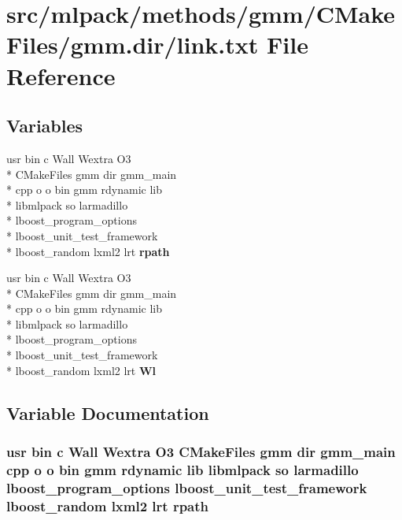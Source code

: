 \section{src/mlpack/methods/gmm/\-C\-Make\-Files/gmm.dir/link.txt File Reference}
\label{methods_2gmm_2CMakeFiles_2gmm_8dir_2link_8txt}
\subsection*{Variables}
\begin{DoxyCompactItemize}
\item 
usr bin c Wall Wextra O3 \\*
C\-Make\-Files gmm dir gmm\-\_\-main \\*
cpp o o bin gmm rdynamic lib \\*
libmlpack so larmadillo \\*
lboost\-\_\-program\-\_\-options \\*
lboost\-\_\-unit\-\_\-test\-\_\-framework \\*
lboost\-\_\-random lxml2 lrt {\bf rpath}
\item 
usr bin c Wall Wextra O3 \\*
C\-Make\-Files gmm dir gmm\-\_\-main \\*
cpp o o bin gmm rdynamic lib \\*
libmlpack so larmadillo \\*
lboost\-\_\-program\-\_\-options \\*
lboost\-\_\-unit\-\_\-test\-\_\-framework \\*
lboost\-\_\-random lxml2 lrt {\bf Wl}
\end{DoxyCompactItemize}


\subsection{Variable Documentation}
\subsubsection[{rpath}]{\setlength{\rightskip}{0pt plus 5cm}usr bin c Wall Wextra O3 C\-Make\-Files gmm dir gmm\-\_\-main cpp o o bin gmm rdynamic lib libmlpack so larmadillo lboost\-\_\-program\-\_\-options lboost\-\_\-unit\-\_\-test\-\_\-framework lboost\-\_\-random lxml2 lrt rpath}\label{methods_2gmm_2CMakeFiles_2gmm_8dir_2link_8txt_ae5ef5732ba9b416d93bd77b3f5383dd8}


